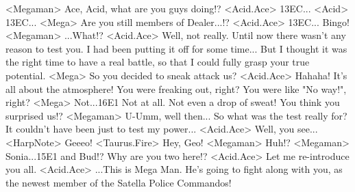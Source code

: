 <Megaman> Ace, Acid, what are you guys doing!? 
<Acid.Ace> {13}{EC}... 
<Acid> {13}{EC}... 
<Mega> Are you still members of Dealer...!? 
<Acid.Ace> {13}{EC}... 
Bingo! 
<Megaman> ...What!? 
<Acid.Ace> Well, not really. Until now there wasn't any reason to test you. 
I had been putting it off for some time... 
But I thought it was the right time to have a real 
battle, so that I could fully grasp your true potential. 
<Mega> So you decided to sneak attack us? 
<Acid.Ace> Hahaha! It's all about the atmosphere! 
You were freaking out, right? 
You were like "No way!", right? 
<Mega> Not...{16}{E1} Not at all. Not even a drop of sweat! 
You think you surprised us!? 
<Megaman> U-Umm, well then... 
So what was the test really for? It couldn't have been just to test my power... 
<Acid.Ace> Well, you see... 
<HarpNote> Geeeo! 
<Taurus.Fire> Hey, Geo! 
<Megaman> Huh!? 
<Megaman> Sonia...{15}{E1} and Bud!? 
Why are you two here!? 
<Acid.Ace> Let me re-introduce you all. 
<Acid.Ace> ...This is Mega Man. 
He's going to fight along with you, as the newest 
member of the Satella Police Commandos! 
